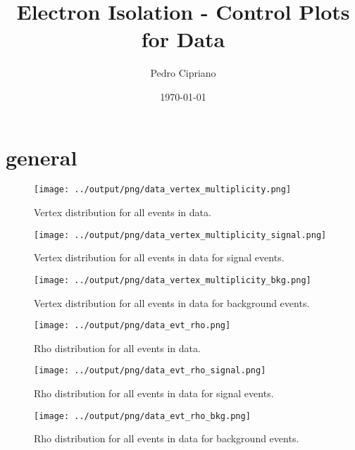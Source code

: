 \documentclass[11pt]{book}
\begin{document}
         
 
 \author{Pedro Cipriano}
 \date{\today}
 \title{Electron Isolation - Control Plots for Data}

\maketitle

\tableofcontents

\chapter{general}


\begin{figure}[htb]
\centering
\texttt{[image: ../output/png/data\_vertex\_multiplicity.png]}
\caption{Vertex distribution for all events in data.}
\label{fig:data_vertex_multiplicity}
\end{figure}

\begin{figure}[htb]
\centering
\texttt{[image: ../output/png/data\_vertex\_multiplicity\_signal.png]}
\caption{Vertex distribution for all events in data for signal events.}
\label{fig:data_vertex_multiplicity_signal}
\end{figure}

\begin{figure}[htb]
\centering
\texttt{[image: ../output/png/data\_vertex\_multiplicity\_bkg.png]}
\caption{Vertex distribution for all events in data for background events.}
\label{fig:data_vertex_multiplicity_bkg}
\end{figure}

\begin{figure}[htb]
\centering
\texttt{[image: ../output/png/data\_evt\_rho.png]}
\caption{Rho distribution for all events in data.}
\label{fig:data_evt_rho}
\end{figure}

\begin{figure}[htb]
\centering
\texttt{[image: ../output/png/data\_evt\_rho\_signal.png]}
\caption{Rho distribution for all events in data for signal events.}
\label{fig:data_evt_rho_signal}
\end{figure}

\begin{figure}[htb]
\centering
\texttt{[image: ../output/png/data\_evt\_rho\_bkg.png]}
\caption{Rho distribution for all events in data for background events.}
\label{fig:data_evt_rho_bkg}
\end{figure}
\end{document}
